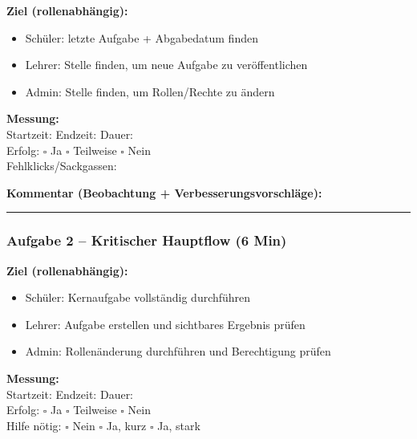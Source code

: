 \noindent\textbf{Ziel (rollenabhängig):}
\begin{itemize}
    \item Schüler: letzte Aufgabe + Abgabedatum finden
    \item Lehrer: Stelle finden, um neue Aufgabe zu veröffentlichen
    \item Admin: Stelle finden, um Rollen/Rechte zu ändern
\end{itemize}

\noindent\textbf{Messung:} \\
Startzeit: \underline{\hspace{2cm}} \quad
Endzeit: \underline{\hspace{2cm}} \quad
Dauer: \underline{\hspace{2cm}} \\
Erfolg: $\square$ Ja \quad $\square$ Teilweise \quad $\square$ Nein \\
Fehlklicks/Sackgassen: \underline{\hspace{3cm}}

\noindent\textbf{Kommentar (Beobachtung + Verbesserungsvorschläge):}

\vspace{2cm}
\noindent\rule{\textwidth}{0.4pt}

\subsubsection*{Aufgabe 2 – Kritischer Hauptflow (6 Min)}

\noindent\textbf{Ziel (rollenabhängig):}
\begin{itemize}
    \item Schüler: Kernaufgabe vollständig durchführen
    \item Lehrer: Aufgabe erstellen und sichtbares Ergebnis prüfen
    \item Admin: Rollenänderung durchführen und Berechtigung prüfen
\end{itemize}

\noindent\textbf{Messung:} \\
Startzeit: \underline{\hspace{2cm}} \quad
Endzeit: \underline{\hspace{2cm}} \quad
Dauer: \underline{\hspace{2cm}} \\
Erfolg: $\square$ Ja \quad $\square$ Teilweise \quad $\square$ Nein \\
Hilfe nötig: $\square$ Nein \quad $\square$ Ja, kurz \quad $\square$ Ja, stark

